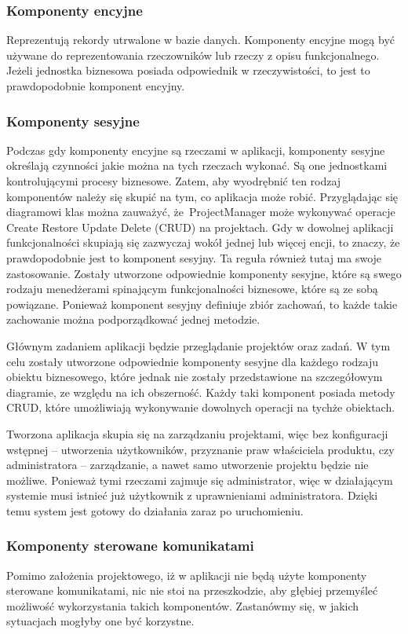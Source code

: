 \subsubsection{Komponenty encyjne}
Reprezentują rekordy utrwalone w bazie danych. Komponenty encyjne mogą być używane do reprezentowania rzeczowników lub rzeczy z opisu funkcjonalnego. Jeżeli jednostka biznesowa posiada odpowiednik w rzeczywistości, to jest to prawdopodobnie komponent encyjny.

\subsubsection{Komponenty sesyjne}
Podczas gdy komponenty encyjne są rzeczami w aplikacji, komponenty sesyjne określają czynności jakie można na tych rzeczach wykonać. Są one jednostkami kontrolującymi procesy biznesowe. Zatem, aby wyodrębnić ten rodzaj komponentów należy się skupić na tym, co aplikacja może robić.
Przyglądając się diagramowi klas można zauważyć, że~ProjectManager może wykonywać operacje Create Restore Update Delete (CRUD) na projektach.
Gdy w dowolnej aplikacji funkcjonalności skupiają się zazwyczaj wokół jednej lub więcej encji, to znaczy, że prawdopodobnie jest to komponent sesyjny. Ta reguła również tutaj ma swoje zastosowanie. Zostały utworzone odpowiednie komponenty sesyjne, które są swego rodzaju menedżerami spinającym funkcjonalności biznesowe, które są ze sobą powiązane. Ponieważ komponent sesyjny definiuje zbiór zachowań, to każde takie zachowanie można podporządkować jednej metodzie.

Głównym zadaniem aplikacji będzie przeglądanie projektów oraz zadań. W tym celu zostały utworzone odpowiednie komponenty sesyjne dla każdego rodzaju obiektu biznesowego, które jednak nie zostały przedstawione na szczegółowym diagramie, ze względu na ich obszerność. Każdy taki komponent posiada metody CRUD, które umożliwiają wykonywanie dowolnych operacji na tychże obiektach.

Tworzona aplikacja skupia się na zarządzaniu projektami, więc bez konfiguracji wstępnej – utworzenia użytkowników, przyznanie praw właściciela produktu, czy administratora  – zarządzanie, a nawet samo utworzenie projektu będzie nie możliwe. Ponieważ tymi rzeczami zajmuje się administrator, więc w działającym systemie musi istnieć już użytkownik z uprawnieniami administratora. Dzięki temu system jest gotowy do działania zaraz po uruchomieniu.

\subsubsection{Komponenty sterowane komunikatami}
Pomimo założenia projektowego, iż w aplikacji nie będą użyte komponenty sterowane komunikatami, nic nie stoi na przeszkodzie, aby głębiej przemyśleć możliwość wykorzystania takich komponentów. Zastanówmy się, w jakich sytuacjach mogłyby one być korzystne.

